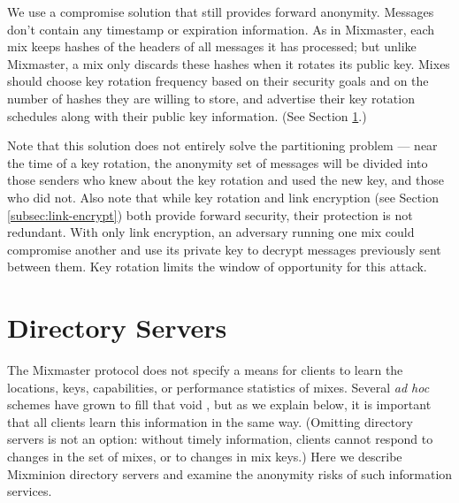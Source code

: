 \documentclass[final]{ieee}
\begin{document}
We use a compromise solution that still provides forward anonymity.  Messages
don't contain any timestamp or expiration information. As in Mixmaster, each
mix keeps hashes of the headers of all messages it has processed; but unlike
Mixmaster, a mix only discards these hashes when it rotates its public
key. Mixes
should choose key rotation frequency based on their security goals and on the
number of hashes they are willing to store, and advertise their key rotation
schedules along with their public key information.  (See Section
\ref{sec:dir-servers}.)

Note that this solution does not entirely solve the partitioning problem
--- near the time of a key rotation, the anonymity set of messages will
be divided into those senders who knew about the key rotation and used
the new key, and those who did not. %
Also note that while key rotation and link encryption (see Section
\ref{subsec:link-encrypt}) both provide forward security, their protection
is not redundant. With only link encryption, an adversary running
one mix could compromise another and use its private key to decrypt
messages previously sent between them. Key rotation limits the window
of opportunity for this attack.



\section{Directory Servers}
\label{sec:dir-servers}

The Mixmaster protocol does not specify a means for clients to learn the
locations, keys, capabilities, or performance statistics of mixes. Several
\emph{ad hoc} schemes have grown to fill that void \cite{echolot}, but as we
explain below, it is important that all clients learn this information in
the same way.  (Omitting directory servers is not an option: without timely
information, clients cannot respond to changes in the set of mixes, or to
changes in mix keys.)
Here
we describe Mixminion directory servers and examine the anonymity risks
of such information services.
\end{document}
